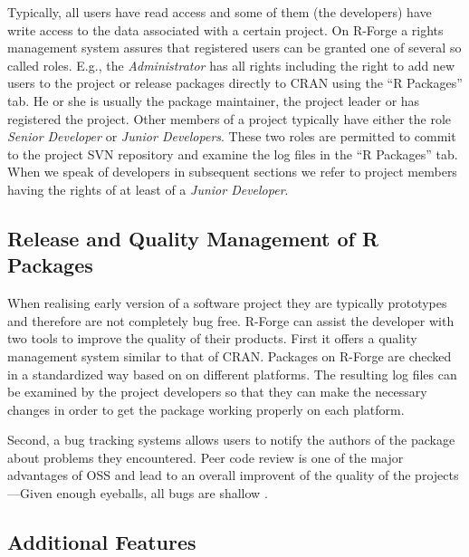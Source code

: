 Typically, all users have read access and some of them (the
developers) have write access to the data associated with
a certain project. On R-Forge a rights management system assures that
registered users can be granted one of several so called roles. 
E.g., the \textit{Administrator} has all rights including the right to
add new users to the project or release packages directly to CRAN
using the ``R Packages'' tab. He or she is usually the package
maintainer, the project leader or has registered the project.
Other members of a project typically have either the role \textit{Senior 
Developer} or \textit{Junior Developers}. These two roles are
permitted to commit to the project 
SVN repository and examine the log files in the ``R Packages'' tab.
When we speak of developers in subsequent sections we refer to project
members having the rights of at least of a \textit{Junior Developer}.


\subsection{Release and Quality Management of R Packages}

When realising early version of a software project they are typically
prototypes and therefore are 
not completely bug free. R-Forge can assist the developer with two
tools to improve the quality of their products. First it offers a
quality management system similar to 
that of CRAN. Packages on R-Forge are checked in a
standardized way based on  on different
platforms. The resulting log files can be examined by the project
developers so that they can make the necessary changes in order to get
the package working properly on each platform.

Second, a bug tracking systems allows users  to notify
the authors of the package about problems they encountered. 
Peer code review is one of the major advantages of OSS and lead to an
overall improvent of the quality of the projects---Given
enough eyeballs, all bugs are shallow \citep{forge:Raymond:1999}.

\subsection{Additional Features}

